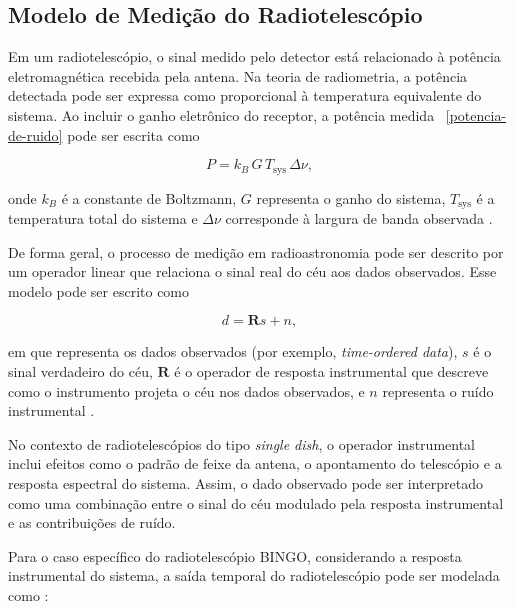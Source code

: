 
\subsection{Modelo de Medição do Radiotelescópio \label{sec:modelo_de_medicao}}


Em um radiotelescópio, o sinal medido pelo detector está relacionado à potência eletromagnética recebida pela antena. Na teoria de radiometria, a potência detectada pode ser expressa como proporcional à temperatura equivalente do sistema. Ao incluir o ganho eletrônico do receptor, a potência medida ~\eqref{potencia-de-ruido} pode ser escrita como

\begin{equation}
P = k_B \, G \, T_{\mathrm{sys}} \, \Delta \nu,
\label{potencia_ruido}
\end{equation}

onde \(k_B\) é a constante de Boltzmann, \(G\) representa o ganho do sistema, \(T_{\mathrm{sys}}\) é a temperatura total do sistema e \(\Delta \nu\) corresponde à largura de banda observada \cite{Price2018}.

De forma geral, o processo de medição em radioastronomia pode ser descrito por um operador linear que relaciona o sinal real do céu aos dados observados. Esse modelo pode ser escrito como

\begin{equation}
    d = \mathbf{R}s + n,
\label{modelo.linear.de.medicao}
\end{equation}

em que representa os dados observados (por exemplo, \textit{time-ordered data}), \(s\) é o sinal verdadeiro do céu, \(\mathbf{R}\) é o operador de resposta instrumental que descreve como o instrumento projeta o céu nos dados observados, e \(n\) representa o ruído instrumental \cite{Monakhov2021}. 

No contexto de radiotelescópios do tipo \textit{single dish}, o operador instrumental inclui efeitos como o padrão de feixe da antena, o apontamento do telescópio e a resposta espectral do sistema. Assim, o dado observado pode ser interpretado como uma combinação entre o sinal do céu modulado pela resposta instrumental e as contribuições de ruído.

Para o caso específico do radiotelescópio BINGO, considerando a resposta instrumental do sistema, a saída temporal do radiotelescópio pode ser modelada como \cite{ramalho2023impactos}:


